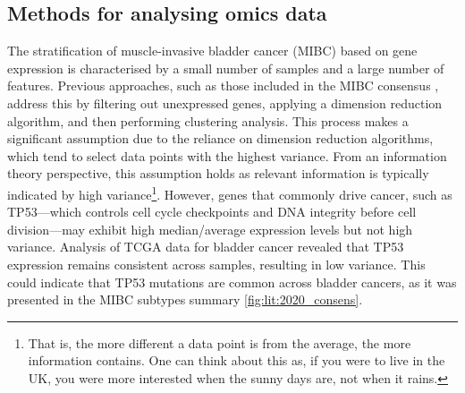 
\subsection{Methods for analysing omics data} \label{s:lit:multi-omics}

\vspace{3mm}
\vspace{3mm}



The stratification of muscle-invasive bladder cancer (MIBC) based on gene expression is characterised by a small number of samples and a large number of features. Previous approaches, such as those included in the MIBC consensus \cite{Kamoun2020-tj}, address this by filtering out unexpressed genes, applying a dimension reduction algorithm, and then performing clustering analysis. This process makes a significant assumption due to the reliance on dimension reduction algorithms, which tend to select data points with the highest variance. From an information theory perspective, this assumption holds as relevant information is typically indicated by high variance\footnote{That is, the more different a data point is from the average, the more information contains. One can think about this as, if you were to live in the UK, you were more interested when the sunny days are, not when it rains.}. However, genes that commonly drive cancer, such as TP53—which controls cell cycle checkpoints and DNA integrity before cell division—may exhibit high median/average expression levels but not high variance. Analysis of TCGA data for bladder cancer \cite{Tcga2018-sj, Robertson2017-mg} revealed that TP53 expression remains consistent across samples, resulting in low variance. This could indicate that TP53 mutations are common across bladder cancers, as it was presented in the MIBC subtypes summary \cref{fig:lit:2020_consens}.

